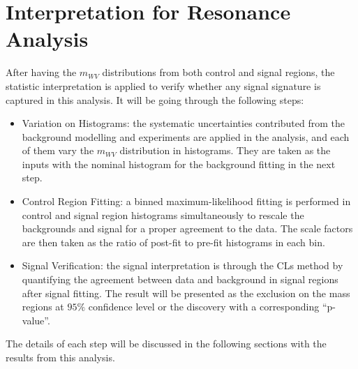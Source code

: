 \chapter{Interpretation for Resonance Analysis}
\label{Ch:resonance_stat}
After having the $m_{WV}$ distributions from both control and signal regions, the statistic interpretation is applied to verify whether any signal signature is captured in this analysis. It will be going through the following steps:

\begin{itemize}
	\item{Variation on Histograms}: the systematic uncertainties contributed from the background modelling and experiments are applied in the analysis, and each of them vary the $m_{WV}$ distribution in histograms. They are taken as the inputs with the nominal histogram for the background fitting in the next step.

	\item{Control Region Fitting}: a binned maximum-likelihood fitting is performed in control and signal region histograms simultaneously to rescale the backgrounds and signal for a proper agreement to the data. The scale factors are then taken as the ratio of post-fit to pre-fit histograms in each bin. 
	
	\item{Signal Verification}: the signal interpretation is through the CLs method by quantifying the agreement between data and background in signal regions after signal fitting. The result will be presented as the exclusion on the mass regions at $95\%$ confidence level or the discovery with a corresponding ``p-value''.
\end{itemize}
The details of each step will be discussed in the following sections with the results from this analysis. 
